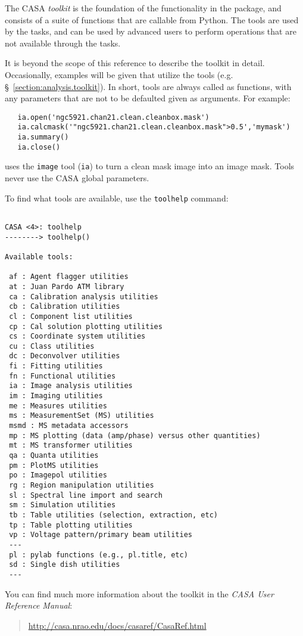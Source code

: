 The CASA {\em toolkit} is the foundation of the functionality in the 
package, and consists of a suite of functions that are callable from
Python.  The tools are used by the tasks, and can be used by advanced
users to perform operations that are not available through the tasks.

It is beyond the scope of this reference to describe the toolkit in 
detail.  Occasionally, examples will be given that utilize the tools
(e.g. \S~\ref{section:analysis.toolkit}).
In short, tools are always called as functions, with any parameters
that are not to be defaulted given as arguments.  For example:
\small
\begin{verbatim}
   ia.open('ngc5921.chan21.clean.cleanbox.mask')
   ia.calcmask('"ngc5921.chan21.clean.cleanbox.mask">0.5','mymask')
   ia.summary()
   ia.close()
\end{verbatim}
\normalsize
uses the {\tt image} tool ({\tt ia}) to turn a clean mask image into
an image mask.  Tools never use the CASA global parameters.

To find what tools are available, use the {\tt toolhelp} command:
\small
\begin{verbatim}

CASA <4>: toolhelp
--------> toolhelp()
 
Available tools: 

 af : Agent flagger utilities
 at : Juan Pardo ATM library
 ca : Calibration analysis utilities
 cb : Calibration utilities
 cl : Component list utilities
 cp : Cal solution plotting utilities
 cs : Coordinate system utilities
 cu : Class utilities
 dc : Deconvolver utilities
 fi : Fitting utilities
 fn : Functional utilities
 ia : Image analysis utilities
 im : Imaging utilities
 me : Measures utilities
 ms : MeasurementSet (MS) utilities
 msmd : MS metadata accessors
 mp : MS plotting (data (amp/phase) versus other quantities)
 mt : MS transformer utilities
 qa : Quanta utilities
 pm : PlotMS utilities
 po : Imagepol utilities
 rg : Region manipulation utilities
 sl : Spectral line import and search
 sm : Simulation utilities
 tb : Table utilities (selection, extraction, etc)
 tp : Table plotting utilities
 vp : Voltage pattern/primary beam utilities
 ---
 pl : pylab functions (e.g., pl.title, etc)
 sd : Single dish utilities
 ---

\end{verbatim}
\normalsize


You can find much more information about the toolkit in the 
{\em CASA User Reference Manual}:
\begin{quote}
  \url{http://casa.nrao.edu/docs/casaref/CasaRef.html}
\end{quote}

